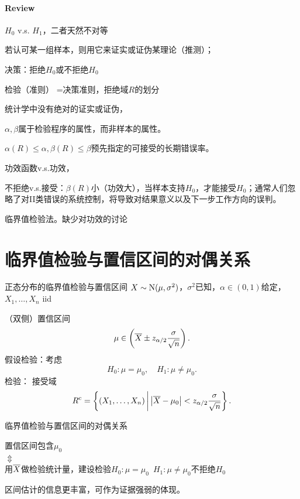 \paragraph{Review}
\begin{compactenum}
	\item $H_0$ v.s. $H_1$，二者天然不对等
	
	若认可某一组样本，则用它来证实或证伪某理论（推测）；
	\item 决策：拒绝$H_0$或不拒绝$H_0$
	
	检验（准则） =决策准则，拒绝域$R$的划分
	\item 统计学中没有绝对的证实或证伪，
	
	$\alpha,\beta$属于检验程序的属性，而非样本的属性。
	
	$\alpha(R)\leqslant\alpha,\beta(R)\leqslant\beta$预先指定的可接受的长期错误率。
	\item 功效函数v.s.功效，
	
	不拒绝v.s.接受：$\beta(R)$小（功效大），当样本支持$H_0$，才能接受$H_0$；通常人们忽略了对II类错误的系统控制，将导致对结果意义以及下一步工作方向的误判。
	\item 临界值检验法。缺少对功效的讨论
\end{compactenum}
\section{临界值检验与置信区间的对偶关系}
\begin{example}{正态分布的临界值检验与置信区间}{}
	$X\sim\operatorname{N}(\mu,\sigma^2)$，$\sigma^2$已知，$\alpha\in(0,1)$给定，$X_1,\ldots,X_n$ iid 

	（双侧）置信区间
	\[
		\mu\in\left(\overline{X}\pm z_{\alpha/2}\frac\sigma{\sqrt n}\right).
	\]
	假设检验：考虑
	\[
		H_0:\mu=\mu_0,\quad H_1:\mu\neq\mu_0.
	\]
	检验：%
	接受域
	\[
		R^\mathrm{c}=\left\{(X_1,\ldots,X_n)\,\middle\vert\,\left\lvert\overline{X}-\mu_0\right\rvert<z_{\alpha/2}\frac\sigma{\sqrt n}\right\}.
	\]
\end{example}
\begin{theorem}{临界值检验与置信区间的对偶关系}{}
	\begin{center}
		置信区间包含$\mu_0$\\
		$\Updownarrow$\\
		用$\overline{X}$做检验统计量，建设检验$H_0:\mu=\mu_0\enspace H_1:\mu\neq\mu_0$不拒绝$H_0$
	\end{center}
\end{theorem}
\begin{remark}
	区间估计的信息更丰富，可作为证据强弱的体现。
\end{remark}
